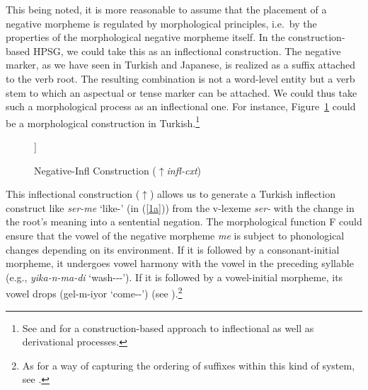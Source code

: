 \documentclass[output=paper]{langsci/langscibook}
\begin{document}
{This being noted, it is more reasonable to assume that the placement of a
negative morpheme is regulated by morphological principles, i.e.\ by
the properties of the morphological negative morpheme itself. In the
construction-based HPSG, we could take this as an inflectional
construction.  The negative marker, as we have seen in Turkish and Japanese, is realized as a suffix
attached to the verb root. The resulting combination is not
a word-level entity but a verb stem to which an aspectual or tense marker can be attached. We could thus take such a morphological process as an inflectional
one. For instance, Figure~\ref{fig:2} could be a morphological
construction in Turkish.\footnote{See \citet{Sag:12} and \citet{Hilpert:16} for a construction-based approach to
inflectional as well as derivational processes.}



\begin{figure}
	\centering	
	\begin{forest}
		[
		\begin{avm}
			\[\tpv{v-neg-stem}\\
			form  \< \textbf{F}\textsubscript{NEG} (X)\>\\
			syn|head|pos  \tpv{verb}\\
			sem \[frames \< \[\tpv{neg-fr}\\
			arg \@{1} \] \>
			\]
			\]	
		\end{avm}
		[
		\begin{avm}
			\[ \tpv{v-lxm}\\
			form  \< X \>\\
			syn|head|pos  \tpv{verb}\\
			sem \[frames  \<\@{1} \> \] 
			\]
		\end{avm}
		]
		]
	\end{forest}
	\caption{Negative-Infl Construction ($\uparrow$\emph{infl-cxt})}\label{fig:2}
\end{figure}	

This inflectional construction ($\uparrow$) allows us to generate a Turkish inflection construct like \textit{ser-me} `like-\NEG' (in (\ref{1a})) from the v-lexeme \textit{ser-} with the change in the root's meaning into a sentential negation. The morphological function F could ensure that the vowel of the negative morpheme \textit{me} is subject to phonological changes depending on its environment. If it is followed by a consonant-initial morpheme, it undergoes vowel harmony with the vowel in the preceding syllable (e.g., \textit{yika-n-ma-di} `wash-\REFL-\NEG-\PST'). If it is followed by a vowel-initial morpheme, its vowel drops (gel-m-iyor `come-\NEG-\PROG') (see \citet{kelepir}).\footnote{As
 for a way of capturing the ordering of suffixes within this kind of system,
 see \citet{Kim:16}.}


}
\end{document}
